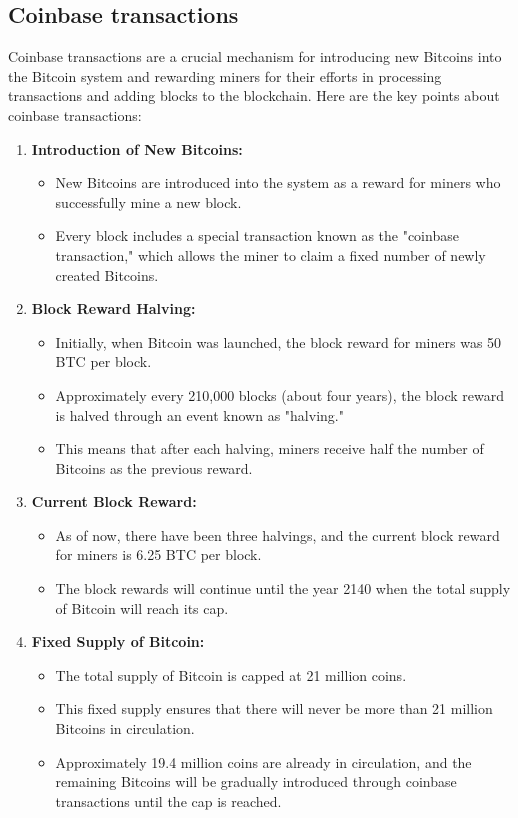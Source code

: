 \subsection{Coinbase transactions}
Coinbase transactions are a crucial mechanism for introducing new Bitcoins into the Bitcoin system and rewarding miners for their efforts in processing transactions and adding blocks to the blockchain. Here are the key points about coinbase transactions:
\begin{enumerate}
	\item \textbf{Introduction of New Bitcoins:}
	\begin{itemize}
		\item New Bitcoins are introduced into the system as a reward for miners who successfully mine a new block.
		\item Every block includes a special transaction known as the "coinbase transaction," which allows the miner to claim a fixed number of newly created Bitcoins.
	\end{itemize}
	\item \textbf{Block Reward Halving:}
	\begin{itemize}
		\item Initially, when Bitcoin was launched, the block reward for miners was 50 BTC per block.
		\item Approximately every 210,000 blocks (about four years), the block reward is halved through an event known as "halving."
		\item This means that after each halving, miners receive half the number of Bitcoins as the previous reward.
	\end{itemize}
	\item \textbf{Current Block Reward:}
	\begin{itemize}
		\item As of now, there have been three halvings, and the current block reward for miners is 6.25 BTC per block.
		\item The block rewards will continue until the year 2140 when the total supply of Bitcoin will reach its cap.
	\end{itemize}
	\item \textbf{Fixed Supply of Bitcoin:}
	\begin{itemize}
		\item The total supply of Bitcoin is capped at 21 million coins.
		\item This fixed supply ensures that there will never be more than 21 million Bitcoins in circulation.
		\item Approximately 19.4 million coins are already in circulation, and the remaining Bitcoins will be gradually introduced through coinbase transactions until the cap is reached.

\end{itemize}
\end{enumerate}
